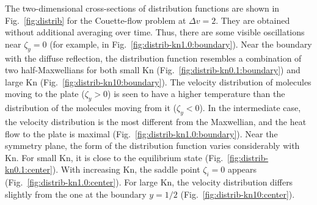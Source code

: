 \documentclass[]{elsarticle} %
\newcommand{\Kn}{\mathrm{Kn}}
\begin{document}
The two-dimensional cross-sections of distribution functions are shown
in Fig.~\ref{fig:distrib} for the Couette-flow problem at \(\Delta{v}=2\).
They are obtained without additional averaging over time.
Thus, there are some visible oscillations near \(\zeta_y=0\)
(for example, in Fig.~\ref{fig:distrib-kn1.0:boundary}).
Near the boundary with the diffuse reflection, the distribution function resembles
a combination of two half-Maxwellians for both small \(\Kn\) (Fig.~\ref{fig:distrib-kn0.1:boundary})
and large \(\Kn\) (Fig.~\ref{fig:distrib-kn10:boundary}).
The velocity distribution of molecules moving to the plate (\(\zeta_y>0\)) is seen to
have a higher temperature than the distribution of the molecules moving from it (\(\zeta_y<0\)).
In the intermediate case, the velocity distribution is the most different from the Maxwellian,
and the heat flow to the plate is maximal (Fig.~\ref{fig:distrib-kn1.0:boundary}).
Near the symmetry plane, the form of the distribution function
varies considerably with \(\Kn\).
For small \(\Kn\), it is close to the equilibrium state (Fig.~\ref{fig:distrib-kn0.1:center}).
With increasing \(\Kn\), the saddle point \(\zeta_i=0\) appears (Fig.~\ref{fig:distrib-kn1.0:center}).
For large \(\Kn\), the velocity distribution differs slightly from the one
at the boundary \(y=1/2\) (Fig.~\ref{fig:distrib-kn10:center}).
\end{document}
